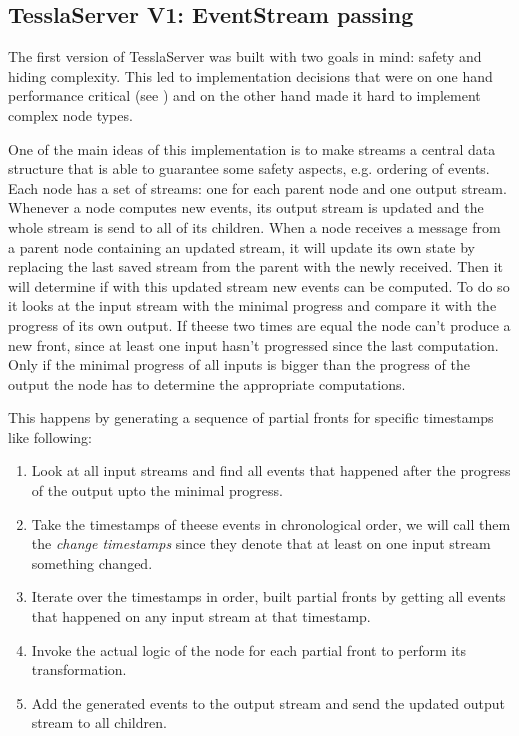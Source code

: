 \subsection{TesslaServer V1: EventStream passing}
\label{sec:implementation:tesslaserver:v1}

The first version of TesslaServer was built with two goals in mind: safety and hiding complexity.
This led to implementation decisions that were on one hand performance critical (see ) and on the other hand made it hard to implement complex node types.

One of the main ideas of this implementation is to make streams a central data structure that is able to guarantee some safety aspects, e.g. ordering of events.
Each node has a set of streams: one for each parent node and one output stream.
Whenever a node computes new events, its output stream is updated and the whole stream is send to all of its children.
When a node receives a message from a parent node containing an updated stream, it will update its own state by replacing the last saved stream from the parent with the newly received.
Then it will determine if with this updated stream new events can be computed.
To do so it looks at the input stream with the minimal progress and compare it with the progress of its own output.
If theese two times are equal the node can't produce a new front, since at least one input hasn't progressed since the last computation.
Only if the minimal progress of all inputs is bigger than the progress of the output the node has to determine the appropriate computations.

This happens by generating a sequence of partial fronts for specific timestamps like following:

\begin{enumerate}
  \item Look at all input streams and find all events that happened after the progress of the output upto the minimal progress.
  \item Take the timestamps of theese events in chronological order, we will call them the \emph{change timestamps} since they denote that at least on one input stream something changed.
  \item Iterate over the timestamps in order, built partial fronts by getting all events that happened on any input stream at that timestamp.
  \item\label{sec:implementation:tesslaserver:v1:item_logic_call} Invoke the actual logic of the node for each partial front to perform its transformation.
  \item Add the generated events to the output stream and send the updated output stream to all children.
\end{enumerate}

